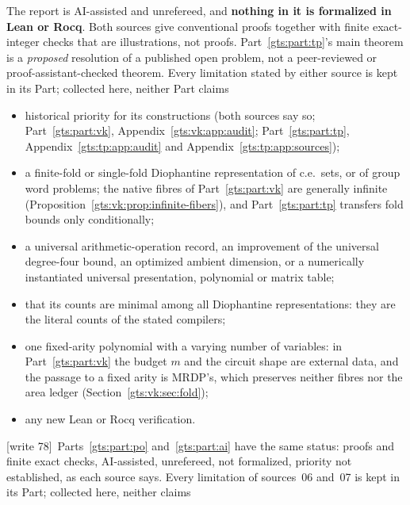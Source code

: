 \documentclass[11pt,letterpaper]{article}
\theoremstyle{definition}
\theoremstyle{remark}
\newcommand{\wtagb}{\textup{[write 78]}}
\begin{document}
The report is AI-assisted and unrefereed, and \textbf{nothing in it is formalized in Lean or Rocq}. Both sources give conventional proofs together with finite exact-integer checks that are illustrations, not proofs. Part~\ref{gts:part:tp}'s main theorem is a \emph{proposed} resolution of a published open problem, not a peer-reviewed or proof-assistant-checked theorem. Every limitation stated by either source is kept in its Part; collected here, neither Part claims
\begin{itemize}
\item historical priority for its constructions (both sources say so; Part~\ref{gts:part:vk}, Appendix~\ref{gts:vk:app:audit}; Part~\ref{gts:part:tp}, Appendix~\ref{gts:tp:app:audit} and Appendix~\ref{gts:tp:app:sources});
\item a finite-fold or single-fold Diophantine representation of c.e.\ sets, or of group word problems; the native fibres of Part~\ref{gts:part:vk} are generally infinite (Proposition~\ref{gts:vk:prop:infinite-fibers}), and Part~\ref{gts:part:tp} transfers fold bounds only conditionally;
\item a universal arithmetic-operation record, an improvement of the universal degree-four bound, an optimized ambient dimension, or a numerically instantiated universal presentation, polynomial or matrix table;
\item that its counts are minimal among all Diophantine representations: they are the literal counts of the stated compilers;
\item one fixed-arity polynomial with a varying number of variables: in Part~\ref{gts:part:vk} the budget $m$ and the circuit shape are external data, and the passage to a fixed arity is MRDP's, which preserves neither fibres nor the area ledger (Section~\ref{gts:vk:sec:fold});
\item any new Lean or Rocq verification.
\end{itemize}
\wtagb\ Parts~\ref{gts:part:po} and~\ref{gts:part:ai} have the same status: proofs and finite exact checks, AI-assisted, unrefereed, not formalized, priority not established, as each source says. Every limitation of sources~06 and~07 is kept in its Part; collected here, neither claims
\end{document}
